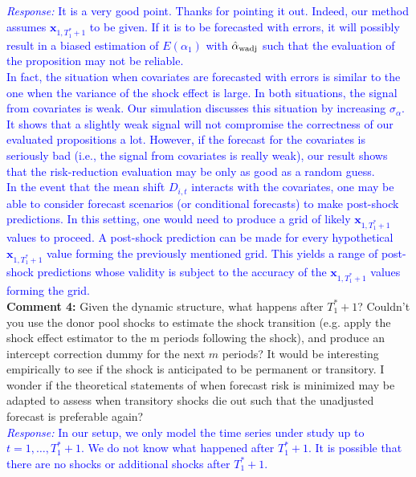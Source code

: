 \documentclass[12pt]{article}
\newcommand{\response}[1]{\noindent \textcolor{blue}{\emph{Response:} #1}}
\begin{document}
{\response{It is a very good point. Thanks for pointing it out. Indeed, our method assumes $\mathbf{x}_{1, T_1^* + 1}$ to be given. If it is to be forecasted with errors, it will possibly result in a biased estimation of $E(\alpha_1)$ with $\hat{\alpha}_{\rm wadj}$ such that the evaluation of the proposition may not be reliable. \\

In fact, the situation when  covariates are forecasted with errors is similar to the one when the variance of the shock effect is large. In both situations, the signal from covariates is weak. Our simulation discusses this situation by increasing $\sigma_{\alpha}$. It shows that a slightly weak signal will not compromise the correctness of our evaluated propositions a lot. However, if the forecast for the covariates is seriously bad (i.e., the signal from covariates is really weak), our result shows that the risk-reduction evaluation may be only as good as a random guess. \\

In the event that the mean shift $D_{i,t}$ interacts with the covariates, one may be able to consider forecast scenarios (or conditional forecasts) \citep{baumeister2014real} to make post-shock predictions. In this setting, one would need to produce a grid of likely $\mathbf{x}_{1, T_1^* + 1}$ values to proceed. A post-shock prediction can be made for every hypothetical $\mathbf{x}_{1, T_1^* + 1}$ value forming the previously mentioned grid. This yields a range of post-shock predictions whose validity is subject to the accuracy of the $\mathbf{x}_{1, T_1^* + 1}$ values forming the grid.
} \\

{\bf Comment 4:} Given the dynamic structure, what happens after $T_1^*+1$? Couldn't you use the donor pool shocks to estimate the shock transition (e.g. apply the shock effect estimator to the m periods following the shock), and produce an intercept correction dummy for the next $m$ periods? It would be interesting empirically to see if the shock is anticipated to be permanent or transitory. I wonder if the theoretical statements of when forecast risk is minimized may be adapted to assess when transitory shocks die out such that the unadjusted forecast is preferable again? \\

\response{In our setup, we only model the time series under study up to $t = 1, \ldots, T_1^*+1$.  We do not know what happened  after $T_1^*+1$. It is possible that there are no shocks or additional shocks after $T_1^*+1$. \\

}}
\end{document}
